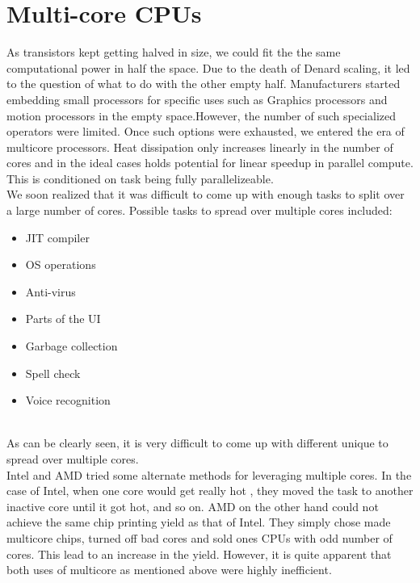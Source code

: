 \documentclass[twoside]{article}
\begin{document}
\section{Multi-core CPUs}
As transistors kept getting halved in size, we could fit the the same computational power in half the space. Due to the death of Denard scaling, it led to the question of what to do with the other empty half. Manufacturers started embedding small processors for specific uses such as Graphics processors and motion processors in the empty space.However, the number of such specialized operators were limited. Once such options were exhausted, we entered the era of multicore processors. Heat dissipation only increases linearly in the number of cores and in the ideal cases holds potential for linear speedup in parallel compute. This is conditioned on task being fully parallelizeable.\\
We soon realized that it was difficult to come up with enough tasks to split over a large number of cores. Possible tasks to spread over multiple cores included:\\
\begin{itemize}
    \item{JIT compiler}
    \item{OS operations}
    \item{Anti-virus}
    \item{Parts of the UI}
    \item{Garbage collection}
    \item{Spell check}
    \item{Voice recognition}
\end{itemize}\\
As can be clearly seen, it is very difficult to come up with different unique to spread over multiple cores.\\
Intel and AMD tried some alternate methods for leveraging multiple cores. In the case of Intel, when one core would get really hot , they moved the task to another inactive core until it got hot, and so on. AMD on the other hand could not achieve the same chip printing yield as that of Intel. They simply chose made multicore chips, turned off bad cores and sold ones CPUs with odd number of cores. This lead to an increase in the yield. However, it is quite apparent that both uses of multicore as mentioned above were highly inefficient.




\end{document}

